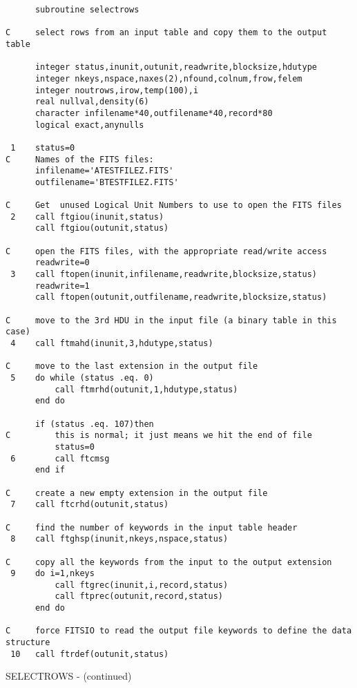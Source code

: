 \newpage
\small
\begin{verbatim}
      subroutine selectrows

C     select rows from an input table and copy them to the output table

      integer status,inunit,outunit,readwrite,blocksize,hdutype
      integer nkeys,nspace,naxes(2),nfound,colnum,frow,felem
      integer noutrows,irow,temp(100),i
      real nullval,density(6)
      character infilename*40,outfilename*40,record*80
      logical exact,anynulls

 1    status=0
C     Names of the FITS files:
      infilename='ATESTFILEZ.FITS'
      outfilename='BTESTFILEZ.FITS'

C     Get  unused Logical Unit Numbers to use to open the FITS files
 2    call ftgiou(inunit,status)
      call ftgiou(outunit,status)

C     open the FITS files, with the appropriate read/write access
      readwrite=0
 3    call ftopen(inunit,infilename,readwrite,blocksize,status)
      readwrite=1
      call ftopen(outunit,outfilename,readwrite,blocksize,status)

C     move to the 3rd HDU in the input file (a binary table in this case)
 4    call ftmahd(inunit,3,hdutype,status)

C     move to the last extension in the output file
 5    do while (status .eq. 0)
          call ftmrhd(outunit,1,hdutype,status)
      end do

      if (status .eq. 107)then
C         this is normal; it just means we hit the end of file
          status=0
 6        call ftcmsg
      end if

C     create a new empty extension in the output file
 7    call ftcrhd(outunit,status)

C     find the number of keywords in the input table header
 8    call ftghsp(inunit,nkeys,nspace,status)

C     copy all the keywords from the input to the output extension
 9    do i=1,nkeys
          call ftgrec(inunit,i,record,status)
          call ftprec(outunit,record,status)
      end do

C     force FITSIO to read the output file keywords to define the data structure
 10   call ftrdef(outunit,status)
\end{verbatim}
\normalsize
\newpage

SELECTROWS - (continued)

